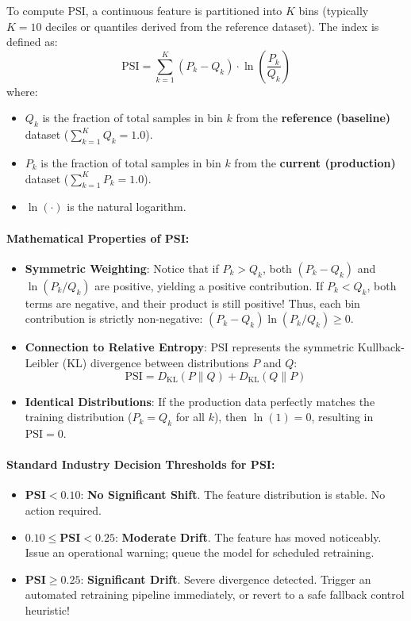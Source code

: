 To compute PSI, a continuous feature is partitioned into $K$ bins (typically $K = 10$ deciles or quantiles derived from the reference dataset). The index is defined as:
\begin{equation}
\text{PSI} = \sum_{k=1}^{K} \left( P_k - Q_k \right) \cdot \ln\left( \frac{P_k}{Q_k} \right)\label{eq:psi_formula}
\end{equation}
where:
\begin{itemize}
    \item $Q_k$ is the fraction of total samples in bin $k$ from the \textbf{reference (baseline)} dataset ($\sum_{k=1}^K Q_k = 1.0$).
    \item $P_k$ is the fraction of total samples in bin $k$ from the \textbf{current (production)} dataset ($\sum_{k=1}^K P_k = 1.0$).
    \item $\ln(\cdot)$ is the natural logarithm.
\end{itemize}

\paragraph{Mathematical Properties of PSI:}
\begin{itemize}
    \item \textbf{Symmetric Weighting}: Notice that if $P_k > Q_k$, both $(P_k - Q_k)$ and $\ln(P_k / Q_k)$ are positive, yielding a positive contribution. If $P_k < Q_k$, both terms are negative, and their product is still positive! Thus, each bin contribution is strictly non-negative: $(P_k - Q_k) \ln(P_k / Q_k) \ge 0$.
    \item \textbf{Connection to Relative Entropy}: PSI represents the symmetric Kullback-Leibler (KL) divergence between distributions $P$ and $Q$:
    \begin{equation}
    \text{PSI} = D_{\text{KL}}(P \parallel Q) + D_{\text{KL}}(Q \parallel P)
    \end{equation}
    \item \textbf{Identical Distributions}: If the production data perfectly matches the training distribution ($P_k = Q_k$ for all $k$), then $\ln(1) = 0$, resulting in $\text{PSI} = 0$.
\end{itemize}

\paragraph{Standard Industry Decision Thresholds for PSI:}
\begin{itemize}
    \item $\mathbf{\text{PSI} < 0.10}$: \textbf{No Significant Shift}. The feature distribution is stable. No action required.
    \item $\mathbf{0.10 \le \text{PSI} < 0.25}$: \textbf{Moderate Drift}. The feature has moved noticeably. Issue an operational warning; queue the model for scheduled retraining.
    \item $\mathbf{\text{PSI} \ge 0.25}$: \textbf{Significant Drift}. Severe divergence detected. Trigger an automated retraining pipeline immediately, or revert to a safe fallback control heuristic!
\end{itemize}

